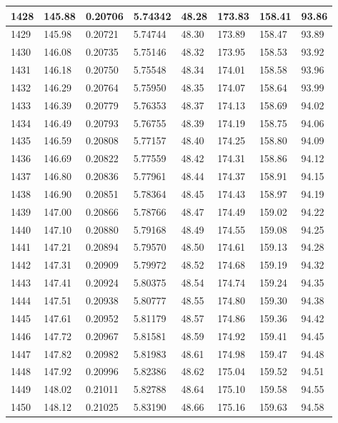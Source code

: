 \documentclass[12pt,a4paper,twoside]{article}
\begin{document}
\begin{center}
\begin{longtable}{l l l l | l l l l}
1428 & 145.88 & 0.20706 & 5.74342 & 48.28 & 173.83 & 158.41 & 93.86 \\ \hline
1429 & 145.98 & 0.20721 & 5.74744 & 48.30 & 173.89 & 158.47 & 93.89 \\ \hline
1430 & 146.08 & 0.20735 & 5.75146 & 48.32 & 173.95 & 158.53 & 93.92 \\ \hline
1431 & 146.18 & 0.20750 & 5.75548 & 48.34 & 174.01 & 158.58 & 93.96 \\ \hline
1432 & 146.29 & 0.20764 & 5.75950 & 48.35 & 174.07 & 158.64 & 93.99 \\ \hline
1433 & 146.39 & 0.20779 & 5.76353 & 48.37 & 174.13 & 158.69 & 94.02 \\ \hline
1434 & 146.49 & 0.20793 & 5.76755 & 48.39 & 174.19 & 158.75 & 94.06 \\ \hline
1435 & 146.59 & 0.20808 & 5.77157 & 48.40 & 174.25 & 158.80 & 94.09 \\ \hline
1436 & 146.69 & 0.20822 & 5.77559 & 48.42 & 174.31 & 158.86 & 94.12 \\ \hline
1437 & 146.80 & 0.20836 & 5.77961 & 48.44 & 174.37 & 158.91 & 94.15 \\ \hline
1438 & 146.90 & 0.20851 & 5.78364 & 48.45 & 174.43 & 158.97 & 94.19 \\ \hline
1439 & 147.00 & 0.20866 & 5.78766 & 48.47 & 174.49 & 159.02 & 94.22 \\ \hline
1440 & 147.10 & 0.20880 & 5.79168 & 48.49 & 174.55 & 159.08 & 94.25 \\ \hline
1441 & 147.21 & 0.20894 & 5.79570 & 48.50 & 174.61 & 159.13 & 94.28 \\ \hline
1442 & 147.31 & 0.20909 & 5.79972 & 48.52 & 174.68 & 159.19 & 94.32 \\ \hline
1443 & 147.41 & 0.20924 & 5.80375 & 48.54 & 174.74 & 159.24 & 94.35 \\ \hline
1444 & 147.51 & 0.20938 & 5.80777 & 48.55 & 174.80 & 159.30 & 94.38 \\ \hline
1445 & 147.61 & 0.20952 & 5.81179 & 48.57 & 174.86 & 159.36 & 94.42 \\ \hline
1446 & 147.72 & 0.20967 & 5.81581 & 48.59 & 174.92 & 159.41 & 94.45 \\ \hline
1447 & 147.82 & 0.20982 & 5.81983 & 48.61 & 174.98 & 159.47 & 94.48 \\ \hline
1448 & 147.92 & 0.20996 & 5.82386 & 48.62 & 175.04 & 159.52 & 94.51 \\ \hline
1449 & 148.02 & 0.21011 & 5.82788 & 48.64 & 175.10 & 159.58 & 94.55 \\ \hline
1450 & 148.12 & 0.21025 & 5.83190 & 48.66 & 175.16 & 159.63 & 94.58 \\ \hline

\end{longtable}
\end{center}
\end{document}
